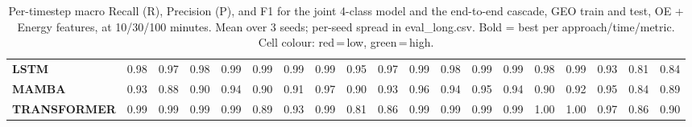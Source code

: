 \begin{table}[t]
{\begin{tabular}{l ccc ccc ccc ccc ccc ccc}
\textbf{LSTM} & \cellcolor[HTML]{51CF66}0.98 & \cellcolor[HTML]{51CF66}0.97 & \cellcolor[HTML]{51CF66}0.98 & \cellcolor[HTML]{51CF66}0.99 & \cellcolor[HTML]{51CF66}0.99 & \cellcolor[HTML]{51CF66}0.99 & \cellcolor[HTML]{51CF66}0.99 & \cellcolor[HTML]{51CF66}0.95 & \cellcolor[HTML]{51CF66}0.97 & \cellcolor[HTML]{51CF66}0.99 & \cellcolor[HTML]{51CF66}0.98 & \cellcolor[HTML]{51CF66}0.99 & \cellcolor[HTML]{51CF66}0.99 & \cellcolor[HTML]{51CF66}0.98 & \cellcolor[HTML]{51CF66}0.99 & \cellcolor[HTML]{51CF66}0.93 & \cellcolor[HTML]{51CF66}0.81 & \cellcolor[HTML]{51CF66}0.84 \\
\textbf{MAMBA} & \cellcolor[HTML]{51CF66}0.93 & \cellcolor[HTML]{51CF66}0.88 & \cellcolor[HTML]{51CF66}0.90 & \cellcolor[HTML]{51CF66}0.94 & \cellcolor[HTML]{51CF66}0.90 & \cellcolor[HTML]{51CF66}0.91 & \cellcolor[HTML]{51CF66}0.97 & \cellcolor[HTML]{51CF66}0.90 & \cellcolor[HTML]{51CF66}0.93 & \cellcolor[HTML]{51CF66}0.96 & \cellcolor[HTML]{51CF66}0.94 & \cellcolor[HTML]{51CF66}0.95 & \cellcolor[HTML]{51CF66}0.94 & \cellcolor[HTML]{51CF66}0.90 & \cellcolor[HTML]{51CF66}0.92 & \cellcolor[HTML]{51CF66}0.95 & \cellcolor[HTML]{51CF66}0.84 & \cellcolor[HTML]{51CF66}0.89 \\
\textbf{TRANSFORMER} & \cellcolor[HTML]{51CF66}0.99 & \cellcolor[HTML]{51CF66}0.99 & \cellcolor[HTML]{51CF66}0.99 & \cellcolor[HTML]{51CF66}0.99 & \cellcolor[HTML]{51CF66}0.89 & \cellcolor[HTML]{51CF66}0.93 & \cellcolor[HTML]{51CF66}0.99 & \cellcolor[HTML]{51CF66}0.81 & \cellcolor[HTML]{51CF66}0.86 & \cellcolor[HTML]{51CF66}0.99 & \cellcolor[HTML]{51CF66}0.99 & \cellcolor[HTML]{51CF66}0.99 & \cellcolor[HTML]{51CF66}0.99 & \cellcolor[HTML]{51CF66}1.00 & \cellcolor[HTML]{51CF66}1.00 & \cellcolor[HTML]{51CF66}0.97 & \cellcolor[HTML]{51CF66}0.86 & \cellcolor[HTML]{51CF66}0.90 \\
\bottomrule
\end{tabular}%
}
\caption{Per-timestep macro Recall (R), Precision (P), and F1 for the joint 4-class model and the end-to-end cascade, GEO train and test, OE + Energy features, at 10/30/100 minutes. Mean over 3 seeds; per-seed spread in eval\_long.csv. Bold = best per approach/time/metric. Cell colour: red\,=\,low, green\,=\,high.}
\label{tab:seq_geo_phys_jc}
\end{table}

